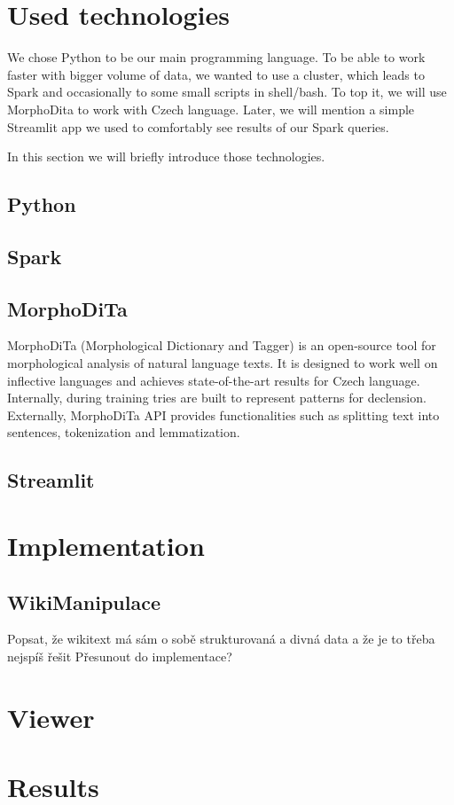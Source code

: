 

\section{Used technologies}
We chose Python to be our main programming language. To be able to work faster with bigger volume of data, we wanted to use a cluster, which leads to Spark and occasionally to some small scripts in shell/bash. To top it, we will use MorphoDita to work with Czech language. Later, we will mention a simple Streamlit app we used to comfortably see results of our Spark queries.

In this section we will briefly introduce those technologies.
\subsection{Python}
\subsection{Spark}

\subsection{MorphoDiTa}
MorphoDiTa \cite{Morphodita} (Morphological Dictionary and Tagger) is an open-source tool for morphological analysis of natural language texts. It is designed to work well on inflective languages and achieves state-of-the-art results for Czech language. Internally, during training tries are built to represent patterns for declension. Externally, MorphoDiTa API provides functionalities such as splitting text into sentences, tokenization and lemmatization. 

\subsection{Streamlit}


\section{Implementation}


\subsection{WikiManipulace}
Popsat, že wikitext má sám o sobě strukturovaná a divná data a že je to třeba nejspíš řešit Přesunout do implementace?

\section{Viewer}
\section{Results}
